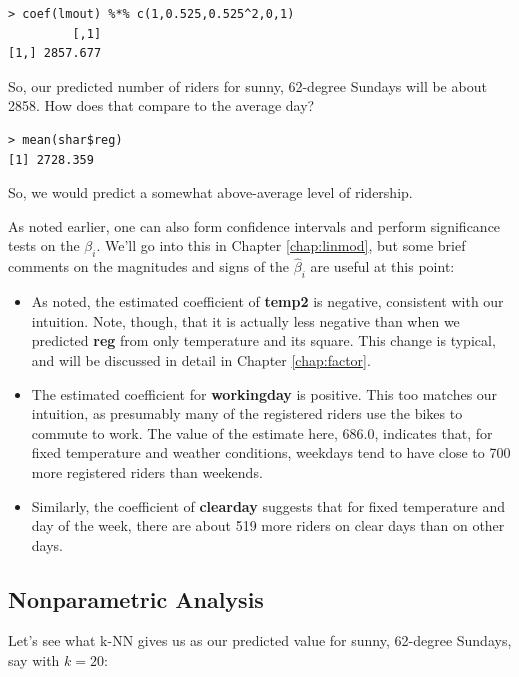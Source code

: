 \begin{lstlisting}
> coef(lmout) %*% c(1,0.525,0.525^2,0,1)
         [,1]
[1,] 2857.677
\end{lstlisting}

So, our predicted number of riders for sunny, 62-degree Sundays will be
about 2858.  How does that compare to the average day?

\begin{lstlisting} 
> mean(shar$reg) 
[1] 2728.359
\end{lstlisting}

So, we would predict a somewhat above-average level of ridership.

As noted earlier, one can also form confidence intervals and perform
significance tests on the $\beta_i$.  We'll go into this in Chapter
\ref{chap:linmod}, but some brief comments on the magnitudes and signs
of the $\widehat{\beta}_i$ are useful at this point:

\begin{itemize}

\item As noted, the estimated coefficient of {\bf temp2} is negative,
consistent with our intuition.  Note, though, that it is actually less
negative than when we predicted {\bf reg} from only temperature and its
square.  This change is typical, and will be discussed in detail in 
Chapter \ref{chap:factor}.

\item The estimated coefficient for {\bf workingday} is positive.  This
too matches our intuition, as presumably many of the registered riders
use the bikes to commute to work.  The value of the estimate here,
686.0, indicates that, for fixed temperature and weather conditions,
weekdays tend to have close to 700 more registered riders than weekends.

\item Similarly, the coefficient of {\bf clearday} suggests that for
fixed temperature and day of the week, there are about 519 more riders
on clear days than on other days.

\end{itemize}

\subsection{Nonparametric Analysis}
\label{knnbike}

Let's see what k-NN gives us as our predicted value for sunny, 62-degree
Sundays, say with $k = 20$:

